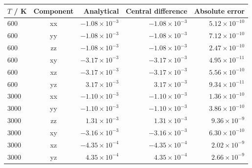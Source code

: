 \begin{tabular}{lcrrr}\toprule
$T$ / K & Component & Analytical & Central difference & Absolute error\\\midrule
600 & xx & $-1.08\times10^{-3}$ & $-1.08\times10^{-3}$ & $5.12\times10^{-10}$\\
600 & yy & $-1.08\times10^{-3}$ & $-1.08\times10^{-3}$ & $7.12\times10^{-10}$\\
600 & zz & $-1.08\times10^{-3}$ & $-1.08\times10^{-3}$ & $2.47\times10^{-10}$\\
600 & xy & $-3.17\times10^{-3}$ & $-3.17\times10^{-3}$ & $4.95\times10^{-11}$\\
600 & xz & $-3.17\times10^{-3}$ & $-3.17\times10^{-3}$ & $5.56\times10^{-10}$\\
600 & yz & $3.17\times10^{-3}$ & $3.17\times10^{-3}$ & $9.34\times10^{-11}$\\
3000 & xx & $-1.10\times10^{-3}$ & $-1.10\times10^{-3}$ & $1.36\times10^{-10}$\\
3000 & yy & $-1.10\times10^{-3}$ & $-1.10\times10^{-3}$ & $3.86\times10^{-10}$\\
3000 & zz & $1.31\times10^{-3}$ & $1.31\times10^{-3}$ & $9.36\times10^{-9}$\\
3000 & xy & $-3.16\times10^{-3}$ & $-3.16\times10^{-3}$ & $6.30\times10^{-10}$\\
3000 & xz & $-4.35\times10^{-4}$ & $-4.35\times10^{-4}$ & $2.02\times10^{-9}$\\
3000 & yz & $4.35\times10^{-4}$ & $4.35\times10^{-4}$ & $2.66\times10^{-9}$\\
\bottomrule\end{tabular}
